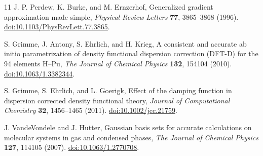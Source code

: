 \begin{thebibliography}{11}
J. P. Perdew, K. Burke, and M. Ernzerhof,
Generalized gradient approximation made simple,
\emph{Physical Review Letters} \textbf{77}, 3865--3868 (1996).
\href{https://doi.org/10.1103/PhysRevLett.77.3865}{doi:10.1103/PhysRevLett.77.3865}.

S. Grimme, J. Antony, S. Ehrlich, and H. Krieg,
A consistent and accurate ab initio parametrization of density functional
dispersion correction (DFT-D) for the 94 elements H--Pu,
\emph{The Journal of Chemical Physics} \textbf{132}, 154104 (2010).
\href{https://doi.org/10.1063/1.3382344}{doi:10.1063/1.3382344}.

S. Grimme, S. Ehrlich, and L. Goerigk,
Effect of the damping function in dispersion corrected density functional theory,
\emph{Journal of Computational Chemistry} \textbf{32}, 1456--1465 (2011).
\href{https://doi.org/10.1002/jcc.21759}{doi:10.1002/jcc.21759}.

J. VandeVondele and J. Hutter,
Gaussian basis sets for accurate calculations on molecular systems in gas
and condensed phases,
\emph{The Journal of Chemical Physics} \textbf{127}, 114105 (2007).
\href{https://doi.org/10.1063/1.2770708}{doi:10.1063/1.2770708}.
\end{thebibliography}
